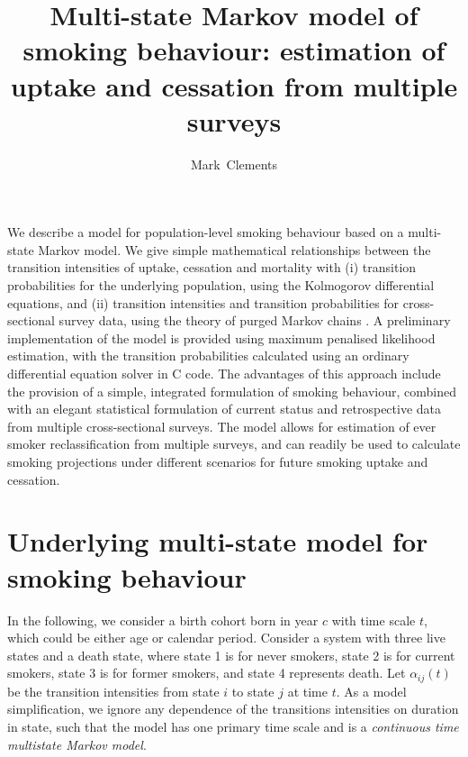 \documentclass[11pt,a4paper]{article}
\title{Multi-state Markov model of smoking behaviour: estimation of
  uptake and cessation from multiple surveys}
\author{Mark~Clements}
\begin{document}
\maketitle

\abstract We describe a model for population-level smoking behaviour
based on a multi-state Markov model. We give simple mathematical
relationships between the transition intensities of uptake, cessation
and mortality with (i) transition probabilities for the underlying
population, using the Kolmogorov differential equations, and (ii)
transition intensities and transition probabilities for
cross-sectional survey data, using the theory of purged Markov chains
\citep{hoem_purged_1969}. A preliminary implementation of the model
is provided using maximum penalised likelihood estimation, with the
transition probabilities calculated using an ordinary differential
equation solver in C code. The advantages of this approach include the
provision of a simple, integrated formulation of smoking behaviour,
combined with an elegant statistical formulation of current status and
retrospective data from multiple cross-sectional surveys. The model
allows for estimation of ever smoker reclassification from multiple
surveys, and can readily be used to calculate smoking projections
under different scenarios for future smoking uptake and cessation. 

\section{Underlying multi-state model for smoking behaviour}

In the following, we consider a birth cohort born in year $c$ with
time scale $t$, which could be either age or calendar period.
Consider a system with three live states and a death state, where
state 1 is for never smokers, state 2 is for current smokers, state 3
is for former smokers, and state 4 represents death. Let
$\alpha_{ij}(t)$ be the transition intensities from state $i$ to state
$j$ at time $t$. As a model simplification, we ignore any dependence
of the transitions intensities on duration in state, such that the
model has one primary time scale and is a \emph{continuous time multistate Markov
  model}.
\end{document}
